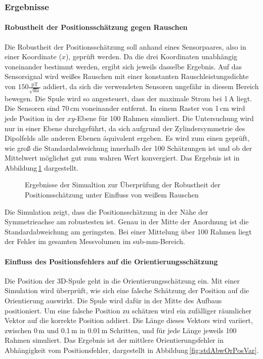 \subsubsection{Ergebnisse}
\paragraph{Robustheit der Positionsschätzung gegen Rauschen}
Die Robustheit der Positionsschätzung soll anhand eines Sensorpaares, also in einer Koordinate ($x$), geprüft werden. Da die drei Koordinaten unabhängig voneinander bestimmt werden, ergibt sich jeweils dasselbe Ergebnis. Auf das Sensorsignal wird weißes Rauschen mit einer konstanten Rauschleistungsdichte von $150\frac{\text{pT}}{\sqrt{\text{Hz}}}$ addiert, da sich die verwendeten Sensoren ungefähr in diesem Bereich bewegen. Die Spule wird so angesteuert, dass der maximale Strom bei 1\,A liegt. Die Sensoren sind 70\,cm voneinander entfernt. In einem Raster von 1\,cm wird jede Position in der $xy$-Ebene für 100 Rahmen simuliert. Die Untersuchung wird nur in einer Ebene durchgeführt, da sich aufgrund der Zylindersymmetrie des Dipolfelds alle anderen Ebenen äquivalent ergeben. Es wird zum einen geprüft, wie groß die Standardabweichung innerhalb der 100 Schätzungen ist und ob der Mittelwert möglichst gut zum wahren Wert konvergiert. Das Ergebnis ist in Abbildung\,\ref{fig:PosSimEval} dargestellt.
\begin{figure}[h]
  \centering
  \caption{Ergebnisse der Simualtion zur Überprüfung der Robustheit der Positionsschätzung unter Einfluss von weißem Rauschen}
  \label{fig:PosSimEval}
\end{figure}
Die Simulation zeigt, dass die Positionsschätzung in der Nähe der Symmetrieachse am robustesten ist. Genau in der Mitte der Anordnung ist die Standardabweichung am geringsten. Bei einer Mittelung über 100 Rahmen liegt der Fehler im gesamten Messvolumen im sub-mm-Bereich. 

\paragraph{Einfluss des Positionsfehlers auf die Orientierungsschätzung}
Die Position der 3D-Spule geht in die Orientierungsschätzung ein. Mit einer Simulation wird überprüft, wie sich eine falsche Schätzung der Position auf die Orientierung auswirkt. Die Spule wird dafür in der Mitte des Aufbaus positioniert. Um eine falsche Position zu schätzen wird ein zufälliger räumlicher Vektor auf die korrekte Position addiert. Die Länge dieses Vektors wird variiert, zwischen 0\,m und 0.1\,m in 0.01\,m Schritten, und für jede Länge jeweils 100 Rahmen simuliert. Das Ergebnis ist der mittlere Orientierungsfehler in Abhängigkeit vom Positionsfehler, dargestellt in Abbildung\,\ref{fig:stdAbwOrPosVar}. 

